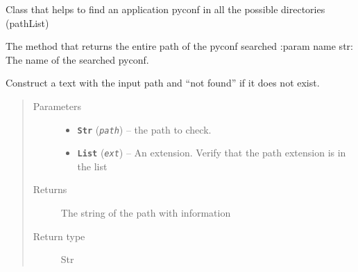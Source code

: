 \documentclass[a4paper,10pt,english]{sphinxmanual}
\begin{document}
\begin{fulllineitems}
\label{commands/apidoc/src:src.configManager.ConfigOpener}
Class that helps to find an application pyconf 
in all the possible directories (pathList)

\begin{fulllineitems}
\label{commands/apidoc/src:src.configManager.ConfigOpener.get_path}
The method that returns the entire path of the pyconf searched
:param name str: The name of the searched pyconf.

\end{fulllineitems}


\end{fulllineitems}


\begin{fulllineitems}
\label{commands/apidoc/src:src.configManager.check_path}
Construct a text with the input path and ``not found'' if it does not exist.
\begin{quote}\begin{description}
\item[{Parameters}] \leavevmode\begin{itemize}
\item {} 
\textbf{\texttt{Str}} (\emph{\texttt{path}}) -- the path to check.

\item {} 
\textbf{\texttt{List}} (\emph{\texttt{ext}}) -- An extension. Verify that the path extension is in the list

\end{itemize}

\item[{Returns}] \leavevmode
The string of the path with information

\item[{Return type}] \leavevmode
Str

\end{description}\end{quote}

\end{fulllineitems}
\end{document}
